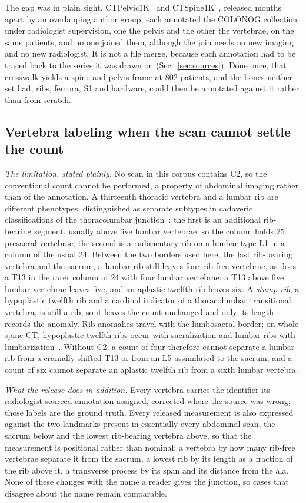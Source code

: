 \documentclass[aapm,mph,amsmath,amssymb,reprint]{revtex4-2}
\begin{document}
The gap was in plain sight. CTPelvic1K~\cite{ctpelvic1k} and CTSpine1K~\cite{ctspine1k},
released months apart by an overlapping author group, each annotated the COLONOG
collection under radiologist supervision, one the pelvis and the other the vertebrae, on the same patients, and no one joined them, although the join needs no new imaging and no
new radiologist. It is not a file merge, because each annotation had to be traced back to the series it was
drawn on (Sec.~\ref{sec:sources}). Done once, that crosswalk yields a spine-and-pelvis frame
at 802 patients, and the bones neither set had, ribs, femora, S1 and hardware, could then be
annotated against it rather than from scratch.



\subsection{Vertebra labeling when the scan cannot settle the count}

\emph{The limitation, stated plainly.} No scan in this corpus contains C2, so the
conventional count cannot be performed, a property of abdominal imaging rather than of the
annotation. A thirteenth thoracic vertebra and a lumbar rib are different phenotypes,
distinguished as separate subtypes in cadaveric classifications of the thoracolumbar
junction~\cite{duplessis2018,poolman2023}: the first is an additional rib-bearing segment,
usually above five lumbar vertebrae, so the column holds 25 presacral vertebrae; the second
is a rudimentary rib on a lumbar-type L1 in a column of the usual 24. Between the two borders
used here, the last rib-bearing vertebra and the sacrum, a lumbar rib still leaves four
rib-free vertebrae, as does a T13 in the rarer column of 24 with four lumbar vertebrae; a T13
above five lumbar vertebrae leaves five, and an aplastic twelfth rib leaves six. A \emph{stump rib}, a hypoplastic twelfth rib and a cardinal indicator of a thoracolumbar
transitional vertebra, is still a rib, so it leaves the count unchanged and only its length
records the anomaly. Rib anomalies travel with the lumbosacral border; on whole-spine CT, hypoplastic
twelfth ribs occur with sacralization and lumbar ribs with lumbarization~\cite{nagata2025}.
Without C2, a count of four therefore cannot separate a lumbar rib from a cranially shifted
T13 or from an L5 assimilated to the sacrum, and a count of six cannot separate an aplastic
twelfth rib from a sixth lumbar vertebra.

\emph{What the release does in addition.} Every vertebra carries the identifier its
radiologist-sourced annotation assigned, corrected where the source was wrong; those labels
are the ground truth. Every released measurement is also expressed against the two landmarks
present in essentially every abdominal scan, the sacrum below and the lowest rib-bearing
vertebra above, so that the measurement is positional rather than nominal: a vertebra by how many rib-free
vertebrae separate it from the sacrum, a lowest rib by its length as a fraction of the rib
above it, a transverse process by its span and its distance from the ala. None of these
changes with the name a reader gives the junction, so cases that disagree about the name
remain comparable.
\end{document}
